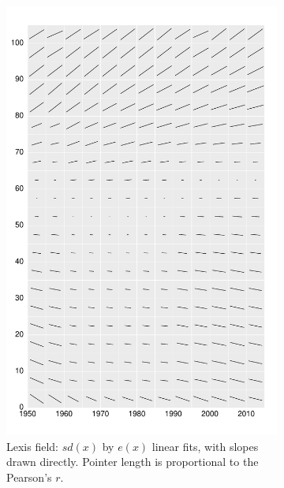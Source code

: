 \documentclass{article}
\begin{document}
\begin{figure}
\begin{subfigure}{.48\textwidth}
  \includegraphics[scale=.38]{Figures/FigApp2.pdf}
  \caption{Lexis field: $sd(x)$ by $e(x)$ linear fits, with slopes drawn directly. Pointer length is proportional to the Pearson's $r$.}
  \label{fig:sfig2}
\end{subfigure}
\begin{subfigure}{.48\textwidth}
\captionsetup{width=.8\linewidth}
  \centering

\end{subfigure}
\end{figure}
\end{document}

